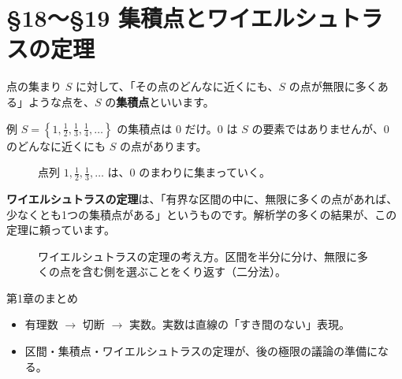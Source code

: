 \documentclass[a4paper,11pt,openany]{ltjsbook}
\begin{document}
\section{§18〜§19 集積点とワイエルシュトラスの定理}

点の集まり $S$ に対して、「その点のどんなに近くにも、$S$ の点が無限に多くある」ような点を、$S$ の\textbf{集積点}といいます。

\begin{examplebox}{例}
$S=\left\{1,\frac12,\frac13,\frac14,\ldots\right\}$ の集積点は $0$ だけ。$0$ は $S$ の要素ではありませんが、$0$ のどんなに近くにも $S$ の点があります。
\end{examplebox}

\begin{figure}[htbp]
\centering
{}
\caption{点列 $1,\frac12,\frac13,\ldots$ は、$0$ のまわりに集まっていく。}
\end{figure}

\textbf{ワイエルシュトラスの定理}は、「有界な区間の中に、無限に多くの点があれば、少なくとも1つの集積点がある」というものです。解析学の多くの結果が、この定理に頼っています。

\begin{figure}[htbp]
\centering
{}
\caption{ワイエルシュトラスの定理の考え方。区間を半分に分け、無限に多くの点を含む側を選ぶことをくり返す（二分法）。}
\end{figure}

\begin{pointbox}{第1章のまとめ}
\begin{itemize}[leftmargin=1.5em]
\item 有理数 $\to$ 切断 $\to$ 実数。実数は直線の「すき間のない」表現。
\item 区間・集積点・ワイエルシュトラスの定理が、後の極限の議論の準備になる。
\end{itemize}
\end{pointbox}
\end{document}
